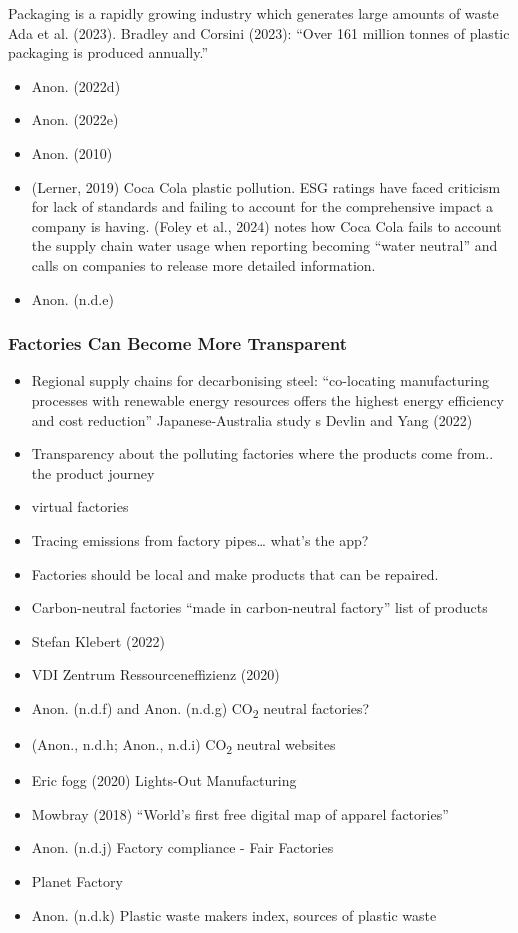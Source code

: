 \documentclass[
  letterpaper,
  DIV=11,
  numbers=noendperiod]{scrartcl}
\providecommand{\tightlist}{%
  \setlength{\itemsep}{0pt}\setlength{\parskip}{0pt}}\usepackage{longtable,booktabs,array}
\begin{document}
Packaging is a rapidly growing industry which generates large amounts of
waste Ada et al. (2023). Bradley and Corsini (2023): ``Over 161 million
tonnes of plastic packaging is produced annually.''

\begin{itemize}
\tightlist
\item
  Anon. (2022d)
\item
  Anon. (2022e)
\item
  Anon. (2010)
\item
  (Lerner, 2019) Coca Cola plastic pollution. ESG ratings have faced
  criticism for lack of standards and failing to account for the
  comprehensive impact a company is having. (Foley et al., 2024) notes
  how Coca Cola fails to account the supply chain water usage when
  reporting becoming ``water neutral'' and calls on companies to release
  more detailed information.
\item
  Anon. (n.d.e)
\end{itemize}

\subsubsection{Factories Can Become More
Transparent}\label{factories-can-become-more-transparent}

\begin{itemize}
\item
  Regional supply chains for decarbonising steel: ``co-locating
  manufacturing processes with renewable energy resources offers the
  highest energy efficiency and cost reduction'' Japanese-Australia
  study s Devlin and Yang (2022)
\item
  Transparency about the polluting factories where the products come
  from.. the product journey
\item
  virtual factories
\item
  Tracing emissions from factory pipes\ldots{} what's the app?
\item
  Factories should be local and make products that can be repaired.
\item
  Carbon-neutral factories ``made in carbon-neutral factory'' list of
  products
\item
  Stefan Klebert (2022)
\item
  VDI Zentrum Ressourceneffizienz (2020)
\item
  Anon. (n.d.f) and Anon. (n.d.g) CO\textsubscript{2} neutral factories?
\item
  (Anon., n.d.h; Anon., n.d.i) CO\textsubscript{2} neutral websites
\item
  Eric fogg (2020) Lights-Out Manufacturing
\item
  Mowbray (2018) ``World's first free digital map of apparel factories''
\item
  Anon. (n.d.j) Factory compliance - Fair Factories
\item
  Planet Factory
\item
  Anon. (n.d.k) Plastic waste makers index, sources of plastic waste
\end{itemize}
\end{document}
